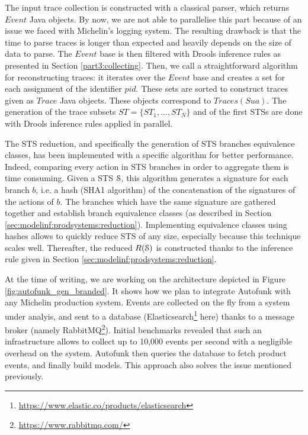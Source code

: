 The input trace collection is constructed with a classical
parser, which returns $Event$ Java objects. By now, we are not
able to parallelise this part because of an issue we faced with
Michelin's logging system. The resulting drawback is that the
time to parse traces is longer than expected and heavily depends
on the size of data to parse. The $Event$ base is then filtered
with Drools inference rules as presented in Section
\ref{part3:collecting}.  Then, we call a straightforward
algorithm for reconstructing traces: it iterates over the $Event$
base and creates a set for each assignment of the identifier
$pid$. These sets are sorted to construct traces given as $Trace$
Java objects. These objects correspond to $Traces(Sua)$. The
generation of the trace subsets $ST= \{ST_1,...,ST_N\}$ and of
the first STSs are done with Drools inference rules applied in
parallel.

The STS reduction, and specifically the generation
of STS branches equivalence classes, has been implemented with a
specific algorithm for better performance. Indeed, comparing
every action in STS branches in order to aggregate them is time
consuming.  Given a STS $\EuScript{S}$, this algorithm generates
a signature for each branch $b$, i.e. a hash (SHA1 algorithm) of
the concatenation of the signatures of the actions of $b$. The
branches which have the same signature are gathered together and
establish branch equivalence classes (as described in Section
\ref{sec:modelinf:prodsystems:reduction}). Implementing
equivalence classes using hashes allows to quickly reduce STS of
any size, especially because this technique scales well.
Thereafter, the reduced $R(\EuScript{S})$ is constructed thanks
to the inference rule given in Section
\ref{sec:modelinf:prodsystems:reduction}.

At the time of writing, we are working on the architecture
depicted in Figure \ref{fig:autofunk_gen_branded}. It shows how we
plan to integrate Autofunk with any Michelin production system.
Events are collected on the fly from a system under analyis, and
sent to a database
(Elasticsearch\footnote{\url{https://www.elastic.co/products/elasticsearch}}
here) thanks to a message broker (namely
RabbitMQ\footnote{\url{https://www.rabbitmq.com/}}). Initial benchmarks
revealed that such an infrastructure allows to collect up to
10,000 events per second with a negligible overhead on the
system. Autofunk then queries the database to fetch product
events, and finally build models. This approach also solves the
issue mentioned previously.

